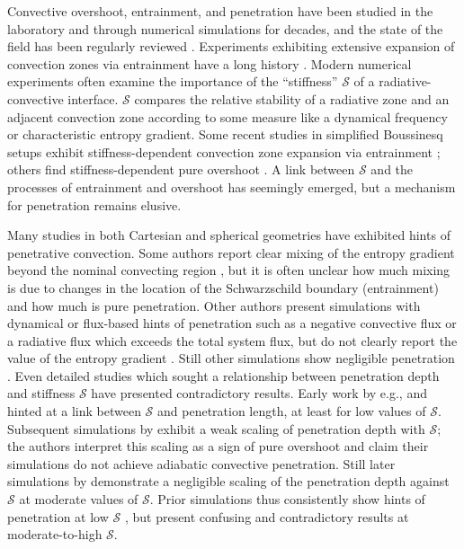 \documentclass[twocolumn]{aastex631}
\newcommand{\mS}{\ensuremath{\mathcal{S}}}
\begin{document}
Convective overshoot, entrainment, and penetration have been studied in the laboratory and through numerical simulations for decades, and the state of the field has been regularly reviewed \citep[e.g.,][]{marcus_etal_1983, zahn1991, browning_etal_2004, rogers_etal_2006, viallet_etal_2015, korre_etal_2019}.
Experiments exhibiting extensive expansion of convection zones via entrainment have a long history \citep[e.g.,][and this process is often confusingly called ``penetration'']{musman1968, deardorff_etal_1969, moore_weiss_1973}.
Modern numerical experiments often examine the importance of the ``stiffness'' $\mS$ of a radiative-convective interface.
$\mS$ compares the relative stability of a radiative zone and an adjacent convection zone according to some measure like a dynamical frequency or characteristic entropy gradient.
Some recent studies in simplified Boussinesq setups exhibit stiffness-dependent convection zone expansion via entrainment \citep{couston_etal_2017, toppaladoddi_wettlaufer_2018}; others find stiffness-dependent pure overshoot \citep{korre_etal_2019}.
A link between $\mS$ and the processes of entrainment and overshoot has seemingly emerged, but a mechanism for penetration remains elusive.

Many studies in both Cartesian and spherical geometries have exhibited hints of penetrative convection.
Some authors report clear mixing of the entropy gradient beyond the nominal convecting region \citep{hurlburt_etal_1994, saikia_etal_2000, brummell_etal_2002, rogers_glatzmaier_2005, rogers_etal_2006, kitiashvili_etal_2016}, but it is often unclear how much mixing is due to changes in the location of the Schwarzschild boundary (entrainment) and how much is pure penetration.
Other authors present simulations with dynamical or flux-based hints of penetration such as a negative convective flux or a radiative flux which exceeds the total system flux, but do not clearly report the value of the entropy gradient \citep{hurlburt_etal_1986, singh_etal_1995, browning_etal_2004, brun_etal_2017, pratt_etal_2017}.
Still other simulations show negligible penetration \citep[e.g.,][]{higl_etal_2021}.
Even detailed studies which sought a relationship between penetration depth and stiffness $\mS$ have presented contradictory results.
Early work by e.g., \citet{hurlburt_etal_1994} and \citet{singh_etal_1995} hinted at a link between $\mS$ and penetration length, at least for low values of $\mS$.
Subsequent simulations by \citet{brummell_etal_2002} exhibit a weak scaling of penetration depth with $\mS$; the authors interpret this scaling as a sign of pure overshoot and claim their simulations do not achieve adiabatic convective penetration.
Still later simulations by \citet{rogers_glatzmaier_2005} demonstrate a negligible scaling of the penetration depth against $\mS$ at moderate values of $\mS$.
Prior simulations thus consistently show hints of penetration at low $\mS$ \citep[where results may not be relevant for stars,][]{couston_etal_2017}, but present confusing and contradictory results at moderate-to-high $\mS$.
\end{document}
